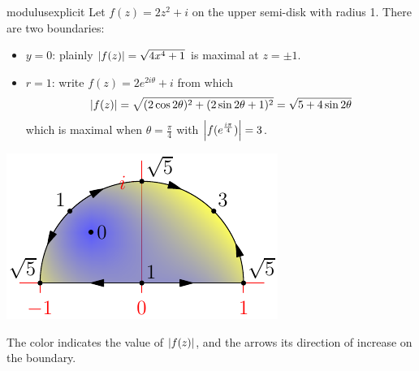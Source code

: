 \begin{example}{}{modulusexplicit}
	Let $f(z)=2z^2+i$ on the upper semi-disk with radius 1. There are two boundaries:\par
		\begin{minipage}[t]{0.65\linewidth}\vspace{0pt}
			\begin{itemize}
			  \item $y=0$: plainly $\left| f(z)\right|=\sqrt{4x^4+1}$ is maximal at $z=\pm 1$.
				\item $r=1$: write $f(z)=2e^{2i\theta}+i$ from which
			  \[
			  	\left| f(z)\right|=\sqrt{(2\cos 2\theta)^2+(2\sin 2\theta+1)^2} =\sqrt{5+4\sin 2\theta}
			  \]
			  which is maximal when $\theta=\frac\pi 4$ with $\left| f(e^{\frac{i\pi}{4}})\right| =3$.
			\end{itemize}
		\end{minipage}
		\hfill
		\begin{minipage}[t]{0.32\linewidth}\vspace{-10pt}
			\flushright\includegraphics[scale=0.95]{maxmod3}
		\end{minipage}\smallbreak
		The color indicates the value of $\left| f(z)\right|$, and the arrows its direction of increase on the boundary. 
\end{example}

